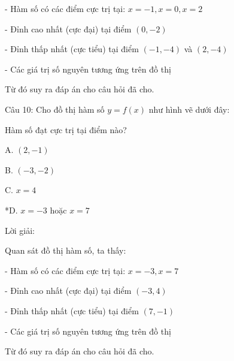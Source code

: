 \documentclass[a4paper,12pt]{article}
\begin{document}
- Hàm số có các điểm cực trị tại: \(x = -1, x = 0, x = 2\)

- Đỉnh cao nhất (cực đại) tại điểm \((0, -2)\)

- Đỉnh thấp nhất (cực tiểu) tại điểm \((-1, -4)\) và \((2, -4)\)

- Các giá trị số nguyên tương ứng trên đồ thị

Từ đó suy ra đáp án cho câu hỏi đã cho.




Câu 10: Cho đồ thị hàm số \(y=f(x)\) như hình vẽ dưới đây:




Hàm số đạt cực trị tại điểm nào?

A. \((2,-1)\)

B. \((-3,-2)\)

C. \(x=4\)

*D. \(x=-3\) hoặc \(x=7\)

Lời giải:


            Quan sát đồ thị hàm số, ta thấy:

- Hàm số có các điểm cực trị tại: \(x = -3, x = 7\)

- Đỉnh cao nhất (cực đại) tại điểm \((-3, 4)\)

- Đỉnh thấp nhất (cực tiểu) tại điểm \((7, -1)\)

- Các giá trị số nguyên tương ứng trên đồ thị

Từ đó suy ra đáp án cho câu hỏi đã cho.
\end{document}

